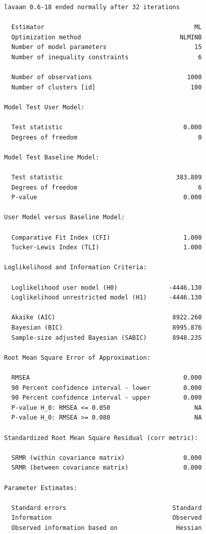 \documentclass[
  letterpaper,
  DIV=11,
  numbers=noendperiod]{scrreprt}
\begin{document}
\begin{verbatim}
lavaan 0.6-18 ended normally after 32 iterations

  Estimator                                         ML
  Optimization method                           NLMINB
  Number of model parameters                        15
  Number of inequality constraints                   6

  Number of observations                          1000
  Number of clusters [id]                          100

Model Test User Model:
                                                      
  Test statistic                                 0.000
  Degrees of freedom                                 0

Model Test Baseline Model:

  Test statistic                               383.809
  Degrees of freedom                                 6
  P-value                                        0.000

User Model versus Baseline Model:

  Comparative Fit Index (CFI)                    1.000
  Tucker-Lewis Index (TLI)                       1.000

Loglikelihood and Information Criteria:

  Loglikelihood user model (H0)              -4446.130
  Loglikelihood unrestricted model (H1)      -4446.130
                                                      
  Akaike (AIC)                                8922.260
  Bayesian (BIC)                              8995.876
  Sample-size adjusted Bayesian (SABIC)       8948.235

Root Mean Square Error of Approximation:

  RMSEA                                          0.000
  90 Percent confidence interval - lower         0.000
  90 Percent confidence interval - upper         0.000
  P-value H_0: RMSEA <= 0.050                       NA
  P-value H_0: RMSEA >= 0.080                       NA

Standardized Root Mean Square Residual (corr metric):

  SRMR (within covariance matrix)                0.000
  SRMR (between covariance matrix)               0.000

Parameter Estimates:

  Standard errors                             Standard
  Information                                 Observed
  Observed information based on                Hessian



\end{verbatim}
\end{document}
